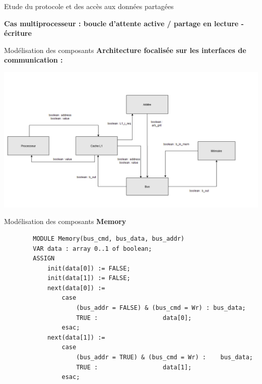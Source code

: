 \documentclass{beamer}
\begin{document}
\begin{frame}{Etude du protocole et des accès aux données partagées}

    \textbf{Cas multiprocesseur : boucle d’attente active / partage en lecture - \hspace*{3.8cm} écriture}
    \vspace*{1.52cm}

\end{frame}

\begin{frame}[fragile]{Modélisation des composants}
    \textbf{Architecture focalisée sur les interfaces de communication :}

    \centering
    \includegraphics[scale=0.44]{CaptureDiagrammeASTRE.png}
\end{frame}

\begin{frame}[fragile]{Modélisation des composants}
    \textbf{Memory}
    \begin{lstlisting}
        MODULE Memory(bus_cmd, bus_data, bus_addr)
        VAR data : array 0..1 of boolean;
        ASSIGN
            init(data[0]) := FALSE;
            init(data[1]) := FALSE;
            next(data[0]) :=
                case
                    (bus_addr = FALSE) & (bus_cmd = Wr) : bus_data;
                    TRUE :					data[0];
                esac;
            next(data[1]) :=
                case
                    (bus_addr = TRUE) & (bus_cmd = Wr) :	bus_data;
                    TRUE :					data[1];
                esac;
    \end{lstlisting}
\end{frame}
\end{document}
